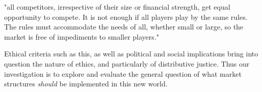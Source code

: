 "all competitors, irrespective of their size or financial strength, get equal opportunity to compete. It is not enough if all players play by the same rules. The rules must accommodate the needs of all, whether small or large, so the market is free of impediments to smaller players." \cite{australianenergymarketoperatorlimited2018}

Ethical criteria such as this, as well as political and social implications bring into question the nature of ethics, and particularly of distributive justice. 
Thus our investigation is to explore and evaluate the general question of what market structures \textit{should} be implemented in this new world.


